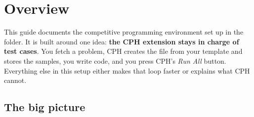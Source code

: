 \chapter{Overview}\label{ch:overview}

This guide documents the competitive programming environment set up in the  folder.
It is built around one idea: \textbf{the CPH extension stays in charge of test cases}. You fetch a problem, CPH creates
the file from your template and stores the samples, you write code, and you press CPH's \emph{Run All} button.
Everything else in this setup either makes that loop faster or explains what CPH cannot.

\section{The big picture}

